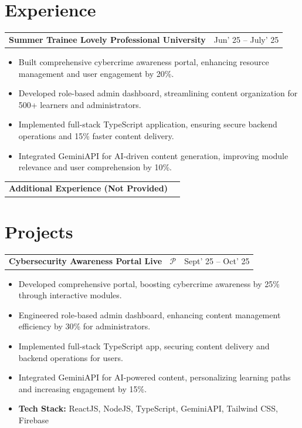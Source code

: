 \documentclass[10pt, a4paper]{article}
\makeatletter
\newcommand{\entryrow}[2]{%
  \noindent\begin{tabularx}{\linewidth}{@{}X@{\hspace{4pt}}r@{}}
    {\color{headingblue}\bfseries\fontsize{8.5pt}{10pt}\selectfont #1} &
    {\fontsize{8.5pt}{10pt}\selectfont #2}
  \end{tabularx}\par\vspace{1pt}%
}
\makeatother
\begin{document}
\section{Experience}

\entryrow{Summer Trainee \textbar{} Lovely Professional University}{Jun' 25 -- July' 25}
\begin{itemize}
  \item Built comprehensive cybercrime awareness portal, enhancing resource management and user engagement by 20\%.
  \item Developed role-based admin dashboard, streamlining content organization for 500+ learners and administrators.
  \item Implemented full-stack TypeScript application, ensuring secure backend operations and 15\% faster content delivery.
  \item Integrated GeminiAPI for AI-driven content generation, improving module relevance and user comprehension by 10\%.
\end{itemize}

\vspace{5pt}
\entryrow{Additional Experience (Not Provided)}{}
\begin{itemize}
\end{itemize}

\section{Projects}

\entryrow{Cybersecurity Awareness Portal \textbar{} Live \textbar{}~\href{https://github.com/G4uravXDev}{\textcolor{linknavy}{\ensuremath{\mathcal{P}}}}}{Sept' 25 -- Oct' 25}
\begin{itemize}
  \item Developed comprehensive portal, boosting cybercrime awareness by 25\% through interactive modules.
  \item Engineered role-based admin dashboard, enhancing content management efficiency by 30\% for administrators.
  \item Implemented full-stack TypeScript app, securing content delivery and backend operations for users.
  \item Integrated GeminiAPI for AI-powered content, personalizing learning paths and increasing engagement by 15\%.
  \item \textbf{Tech Stack:} ReactJS, NodeJS, TypeScript, GeminiAPI, Tailwind CSS, Firebase
\end{itemize}
\end{document}
